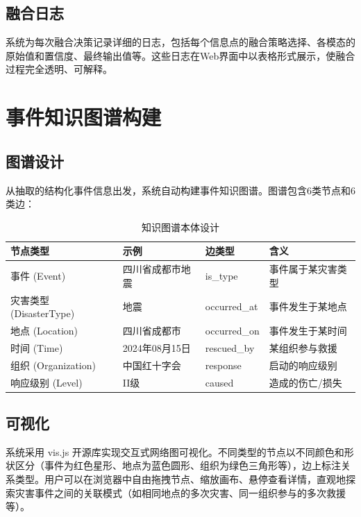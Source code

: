 \documentclass[12pt, a4paper]{ctexart}
\begin{document}
\subsection{融合日志}

系统为每次融合决策记录详细的日志，包括每个信息点的融合策略选择、各模态的原始值和置信度、最终输出值等。这些日志在Web界面中以表格形式展示，使融合过程完全透明、可解释。


\section{事件知识图谱构建}

\subsection{图谱设计}

从抽取的结构化事件信息出发，系统自动构建事件知识图谱。图谱包含6类节点和6类边：

\begin{table}[H]
\centering
\caption{知识图谱本体设计}
\label{tab:kg}
\begin{tabular}{llll}
\toprule
\textbf{节点类型} & \textbf{示例} & \textbf{边类型} & \textbf{含义} \\
\midrule
事件 (Event) & 四川省成都市地震 & is\_type & 事件属于某灾害类型 \\
灾害类型 (DisasterType) & 地震 & occurred\_at & 事件发生于某地点 \\
地点 (Location) & 四川省成都市 & occurred\_on & 事件发生于某时间 \\
时间 (Time) & 2024年08月15日 & rescued\_by & 某组织参与救援 \\
组织 (Organization) & 中国红十字会 & response & 启动的响应级别 \\
响应级别 (Level) & II级 & caused & 造成的伤亡/损失 \\
\bottomrule
\end{tabular}
\end{table}

\subsection{可视化}

系统采用 vis.js 开源库实现交互式网络图可视化。不同类型的节点以不同颜色和形状区分（事件为红色星形、地点为蓝色圆形、组织为绿色三角形等），边上标注关系类型。用户可以在浏览器中自由拖拽节点、缩放画布、悬停查看详情，直观地探索灾害事件之间的关联模式（如相同地点的多次灾害、同一组织参与的多次救援等）。
\end{document}
